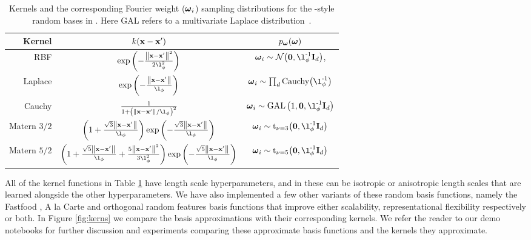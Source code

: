 \documentclass[11pt, oneside]{article}
\begin{document}
\begin{table}[htb]

    \centering

    \caption{Kernels and the corresponding Fourier weight ($\boldsymbol{\omega}_i$)
        sampling distributions for the \citet{rahimi2007}-style random bases in
        \revrand{}. Here GAL refers to a multivariate Laplace
        distribution~\cite{kozubowski2013multivariate}.}

    \begin{tabular}{r|c c}
        \textbf{Kernel} & $k\!\left({\mathbf{x} - \mathbf{x}'}\right)$
        & $p_{\boldsymbol{\omega}}(\boldsymbol{\omega})$ \\
        \hline
        RBF &
        $\exp\brac{-\frac{\lnorm{}{\inss - \inssprime}^2}{2\lenscale^2}}$ &
            $\ffourier_i \sim \gaus{\mathbf{0}, \lenscale\inv\ident{d}}$, \\
        Laplace & $\exp\brac{-\frac{\lnorm{}{\inss-\inssprime}}{\lenscale}}$ &
            $\ffourier_i \sim \prod_d \text{Cauchy}\!\brac{\lenscale\inv}$ \\
        Cauchy &
            $\frac{1}{1+\brac{\lnorm{}{\inss-\inssprime}/\lenscale}^2}$ & 
            $\ffourier_i \sim \text{GAL}\brac{1, \mathbf{0},
                \lenscale\inv\ident{d}}$ \\
        Matern $3/2$ & 
            $\brac{1 + \frac{\sqrt{3}\lnorm{}{\inss-\inssprime}}{\lenscale}}
            \exp\brac{-\frac{\sqrt{3}\lnorm{}{\inss-\inssprime}}{\lenscale}}$ & 
            $\ffourier_i \sim 
            \text{t}_{\nu=3}\!\brac{\mathbf{0}, \lenscale\inv\ident{d}}$ \\
        Matern $5/2$ &
            $\brac{1 + \frac{\sqrt{5}\lnorm{}{\inss-\inssprime}}{\lenscale} + 
                \frac{5\lnorm{}{\inss - \inssprime}^2}{3\lenscale^2}}
            \exp\brac{-\frac{\sqrt{5}\lnorm{}{\inss-\inssprime}}{\lenscale}}$ & 
            $\ffourier_i \sim 
            \text{t}_{\nu=5}\!\brac{\mathbf{0}, \lenscale\inv\ident{d}}$ \\
        \hline
    \end{tabular}

    \label{tab:randommappings}

\end{table}

All of the kernel functions in Table \ref{tab:randommappings} have length scale
hyperparameters, and in \revrand{} these can be isotropic or anisotropic length
scales that are learned alongside the other hyperparameters. We have also
implemented a few other variants of these random basis functions, namely the
Fastfood \citep{le2013fastfood}, A la Carte \citep{yang2014} and orthogonal
random features \citep{Yu2016orthogonal} basis functions that improve either
scalability, representational flexibility respectively or both. In Figure
\ref{fig:kerns} we compare the basis approximations with their corresponding
kernels. We refer the reader to our demo notebooks for further discussion and
experiments comparing these approximate basis functions and the kernels they
approximate.
\end{document}

